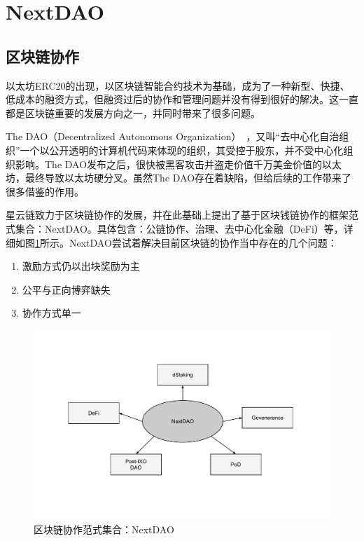 \section{NextDAO}
\subsection{区块链协作}
以太坊ERC20的出现，以区块链智能合约技术为基础，成为了一种新型、快捷、低成本的融资方式，但融资过后的协作和管理问题并没有得到很好的解决。这一直都是区块链重要的发展方向之一，并同时带来了很多问题。

The DAO（Decentralized Autonomous Organization）~\cite{DAO}，又叫“去中心化自治组织”一个以公开透明的计算机代码来体现的组织，其受控于股东，并不受中心化组织影响。The DAO发布之后，很快被黑客攻击并盗走价值千万美金价值的以太坊，最终导致以太坊硬分叉。虽然The DAO存在着缺陷，但给后续的工作带来了很多借鉴的作用。

星云链致力于区块链协作的发展，并在此基础上提出了基于区块钱链协作的框架范式集合：NextDAO。具体包含：公链协作、治理、去中心化金融（DeFi）等，详细如图\ref{fig:nextdao}所示。NextDAO尝试着解决目前区块链的协作当中存在的几个问题：

\begin{enumerate}[\hspace{1cm}(a)]
  \item 激励方式仍以出块奖励为主
  \item 公平与正向博弈缺失
  \item 协作方式单一
\end{enumerate}

\begin{figure}[htbp]
  \centering
  \includegraphics[width=1\textwidth]{../common/nextdao.pdf}
  \caption{区块链协作范式集合：NextDAO \label{fig:nextdao}}
\end{figure}

